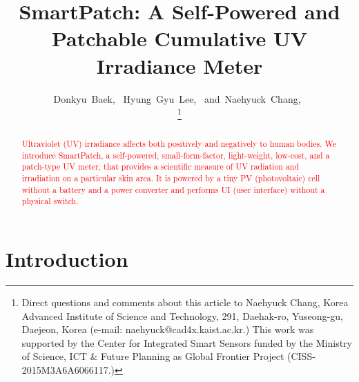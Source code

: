 \documentclass[journal]{IEEEtran}
\begin{document}
\title{SmartPatch: A Self-Powered and Patchable Cumulative UV Irradiance Meter}

\author{
	Donkyu~Baek,~
	Hyung~Gyu~Lee,~
	and~Naehyuck~Chang,~

\thanks{Direct questions and comments about this article to Naehyuck Chang, Korea Advanced Institute of Science and Technology, 291, Daehak-ro, Yuseong-gu, Daejeon, Korea (e-mail: naehyuck@cad4x.kaist.ac.kr.) This work was supported by the Center for Integrated Smart Sensors funded by the Ministry of Science, ICT \& Future Planning as Global Frontier Project (CISS-2015M3A6A6066117.)}
}

\maketitle

\begin{abstract}
\textcolor{red}{Ultraviolet (UV) irradiance affects both positively and negatively to human bodies. We introduce SmartPatch, a self-powered, small-form-factor, light-weight, low-cost, and a patch-type UV meter, that provides a scientific measure of UV radiation and irradiation on a particular skin area. It is powered by a tiny PV (photovoltaic) cell without a battery and a power converter and performs UI (user interface) without a physical switch.} 
\end{abstract}



\section{Introduction}
\end{document}
